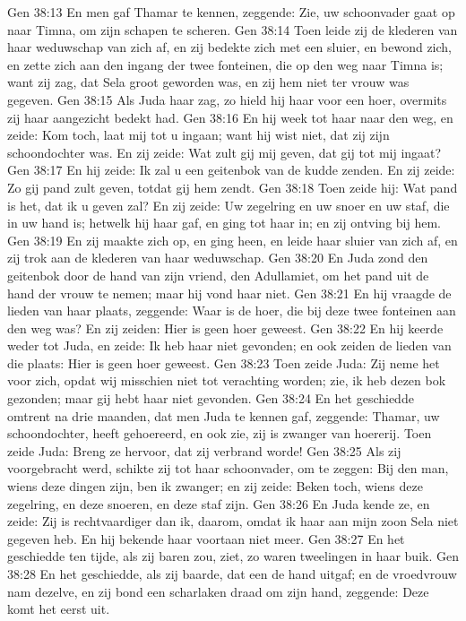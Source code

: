 Gen 38:13  En men gaf Thamar te kennen, zeggende: Zie, uw schoonvader gaat op naar Timna, om zijn schapen te scheren.
Gen 38:14  Toen leide zij de klederen van haar weduwschap van zich af, en zij bedekte zich met een sluier, en bewond zich, en zette zich aan den ingang der twee fonteinen, die op den weg naar Timna is; want zij zag, dat Sela groot geworden was, en zij hem niet ter vrouw was gegeven.
Gen 38:15  Als Juda haar zag, zo hield hij haar voor een hoer, overmits zij haar aangezicht bedekt had.
Gen 38:16  En hij week tot haar naar den weg, en zeide: Kom toch, laat mij tot u ingaan; want hij wist niet, dat zij zijn schoondochter was. En zij zeide: Wat zult gij mij geven, dat gij tot mij ingaat?
Gen 38:17  En hij zeide: Ik zal u een geitenbok van de kudde zenden. En zij zeide: Zo gij pand zult geven, totdat gij hem zendt.
Gen 38:18  Toen zeide hij: Wat pand is het, dat ik u geven zal? En zij zeide: Uw zegelring en uw snoer en uw staf, die in uw hand is; hetwelk hij haar gaf, en ging tot haar in; en zij ontving bij hem.
Gen 38:19  En zij maakte zich op, en ging heen, en leide haar sluier van zich af, en zij trok aan de klederen van haar weduwschap.
Gen 38:20  En Juda zond den geitenbok door de hand van zijn vriend, den Adullamiet, om het pand uit de hand der vrouw te nemen; maar hij vond haar niet.
Gen 38:21  En hij vraagde de lieden van haar plaats, zeggende: Waar is de hoer, die bij deze twee fonteinen aan den weg was? En zij zeiden: Hier is geen hoer geweest.
Gen 38:22  En hij keerde weder tot Juda, en zeide: Ik heb haar niet gevonden; en ook zeiden de lieden van die plaats: Hier is geen hoer geweest.
Gen 38:23  Toen zeide Juda: Zij neme het voor zich, opdat wij misschien niet tot verachting worden; zie, ik heb dezen bok gezonden; maar gij hebt haar niet gevonden.
Gen 38:24  En het geschiedde omtrent na drie maanden, dat men Juda te kennen gaf, zeggende: Thamar, uw schoondochter, heeft gehoereerd, en ook zie, zij is zwanger van hoererij. Toen zeide Juda: Breng ze hervoor, dat zij verbrand worde!
Gen 38:25  Als zij voorgebracht werd, schikte zij tot haar schoonvader, om te zeggen: Bij den man, wiens deze dingen zijn, ben ik zwanger; en zij zeide: Beken toch, wiens deze zegelring, en deze snoeren, en deze staf zijn.
Gen 38:26  En Juda kende ze, en zeide: Zij is rechtvaardiger dan ik, daarom, omdat ik haar aan mijn zoon Sela niet gegeven heb. En hij bekende haar voortaan niet meer.
Gen 38:27  En het geschiedde ten tijde, als zij baren zou, ziet, zo waren tweelingen in haar buik.
Gen 38:28  En het geschiedde, als zij baarde, dat een de hand uitgaf; en de vroedvrouw nam dezelve, en zij bond een scharlaken draad om zijn hand, zeggende: Deze komt het eerst uit.
